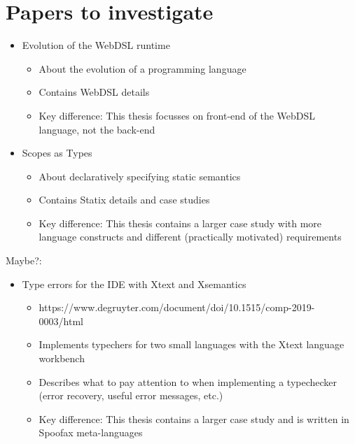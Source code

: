   \section{Papers to investigate}

    \begin{itemize}
      \item Evolution of the WebDSL runtime
      \begin{itemize}
        \item About the evolution of a programming language
        \item Contains WebDSL details
        \item Key difference: This thesis focusses on front-end of the WebDSL language, not the back-end
      \end{itemize}

      \item Scopes as Types
      \begin{itemize}
        \item About declaratively specifying static semantics
        \item Contains Statix details and case studies
        \item Key difference: This thesis contains a larger case study with more language constructs and different (practically motivated) requirements
      \end{itemize}

    \end{itemize}

    Maybe?:
    \begin{itemize}
      \item Type errors for the IDE with Xtext and Xsemantics
      \begin{itemize}
        \item https://www.degruyter.com/document/doi/10.1515/comp-2019-0003/html
        \item Implements typechers for two small languages with the Xtext language workbench
        \item Describes what to pay attention to when implementing a typechecker (error recovery, useful error messages, etc.)
        \item Key difference: This thesis contains a larger case study and is written in Spoofax meta-languages
      \end{itemize}
    \end{itemize}